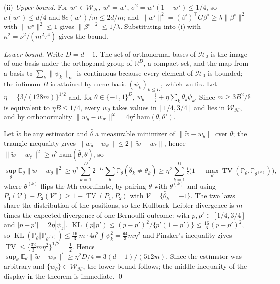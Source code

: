 \documentclass[12pt]{article}
\newcommand{\R}{\mathbb{R}}
\newcommand{\E}{\mathbb{E}}
\newcommand{\Prob}{\mathbb{P}}
\newcommand{\calH}{\mathcal{H}}
\newcommand{\calW}{\mathcal{W}}
\newcommand{\supn}[1]{\|#1\|_{\infty}}
\newcommand{\norm}[1]{\|#1\|}
\newcommand{\wstar}{w^{\star}}
\newcommand{\wproj}{w^{\circ}}
\newcommand{\bproj}{\beta^{\circ}}
\newcommand{\TV}{\operatorname{TV}}
\newcommand{\KL}{\operatorname{KL}}
\begin{document}
(ii) \emph{Upper bound.} For $\wstar\in\calW_{\calH}$, $\wproj=\wstar$, $\sigma^2=\wstar(1-\wstar)\le1/4$, so $c(\wstar)\le d/4$ and $8c(\wstar)/m\le2d/m$; and $\norm{\wstar}^2=(\bproj)^{\top}G\bproj\ge\lambda\norm{\bproj}^2$ with $\norm{\wstar}^2\le1$ gives $\norm{\bproj}^2\le1/\lambda$. Substituting into (i) with $\kappa^2=\nu^2/(m^2\tau^4)$ gives the bound.

\emph{Lower bound.} Write $D=d-1$. The set of orthonormal bases of $\calH_0$ is the image of one basis under the orthogonal group of $\R^D$, a compact set, and the map from a basis to $\sum_k\supn{\psi_k}$ is continuous because every element of $\calH_0$ is bounded; the infimum $B$ is attained by some basis $(\psi_k)_{k\le D}$, which we fix. Let $\eta=\{3/(128m)\}^{1/2}$ and, for $\theta\in\{-1,1\}^D$, $w_\theta=\tfrac12+\eta\sum_k\theta_k\psi_k$. Since $m\ge3B^2/8$ is equivalent to $\eta B\le1/4$, every $w_\theta$ takes values in $[1/4,3/4]$ and lies in $\calW_{\calH}$, and by orthonormality $\norm{w_\theta-w_{\theta'}}^2=4\eta^2\,\mathrm{ham}(\theta,\theta')$.

Let $\tilde w$ be any estimator and $\hat\theta$ a measurable minimizer of $\norm{\tilde w-w_\theta}$ over $\theta$; the triangle inequality gives $\norm{w_{\hat\theta}-w_\theta}\le2\norm{\tilde w-w_\theta}$, hence $\norm{\tilde w-w_\theta}^2\ge\eta^2\,\mathrm{ham}(\hat\theta,\theta)$, so
\[
\sup_{\theta}\E_\theta\norm{\tilde w-w_\theta}^2\ge\eta^2\sum_{k=1}^{D}2^{-D}\sum_\theta\Prob_\theta(\hat\theta_k\neq\theta_k)\ge\eta^2\sum_{k=1}^{D}\tfrac12\big(1-\max_\theta\TV(\Prob_\theta,\Prob_{\theta^{(k)}})\big),
\]
where $\theta^{(k)}$ flips the $k$th coordinate, by pairing $\theta$ with $\theta^{(k)}$ and using $P_1(\mathcal{V})+P_2(\mathcal{V}^c)\ge1-\TV(P_1,P_2)$ with $\mathcal{V}=\{\hat\theta_k=-1\}$. The two laws share the distribution of the positions, so the Kullback--Leibler divergence is $m$ times the expected divergence of one Bernoulli outcome: with $p,p'\in[1/4,3/4]$ and $|p-p'|=2\eta|\psi_k|$, $\KL(p\Vert p')\le(p-p')^2/\{p'(1-p')\}\le\frac{16}{3}(p-p')^2$, so $\KL(\Prob_\theta\Vert\Prob_{\theta^{(k)}})\le\frac{16}{3}\,m\cdot4\eta^2\int\psi_k^2=\frac{64}{3}m\eta^2$ and Pinsker's inequality gives $\TV\le\{\frac{32}{3}m\eta^2\}^{1/2}=\frac12$. Hence $\sup_\theta\E_\theta\norm{\tilde w-w_\theta}^2\ge\eta^2D/4=3(d-1)/(512m)$. Since the estimator was arbitrary and $\{w_\theta\}\subset\calW_{\calH}$, the lower bound follows; the middle inequality of the display in the theorem is immediate. \qed
\end{document}
